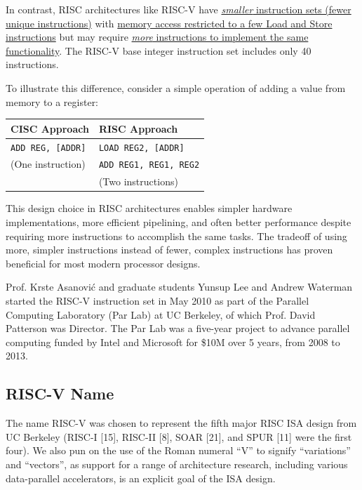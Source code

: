 \documentclass[12pt, a4paper]{article}
\begin{document}
In contrast, RISC architectures like RISC-V have \ul{\textit{smaller} instruction sets (fewer unique instructions)} with \ul{memory access restricted to a few Load and Store instructions} but may require \ul{\textit{more} instructions to implement the same functionality}. The RISC-V base integer instruction set includes only 40 instructions.

\vspace{1em}
To illustrate this difference, consider a simple operation of adding a value from memory to a register:

\begin{center}
\begin{tabular}{|l|l|}
\hline
\textbf{CISC Approach} & \textbf{RISC Approach} \\
\hline
\texttt{ADD REG, [ADDR]} & \texttt{LOAD REG2, [ADDR]} \\
(One instruction) & \texttt{ADD REG1, REG1, REG2} \\
 & (Two instructions) \\
\hline
\end{tabular}
\end{center}

\vspace{1em}
This design choice in RISC architectures enables simpler hardware implementations, more efficient pipelining, and often better performance despite requiring more instructions to accomplish the same tasks. The tradeoff of using more, simpler instructions instead of fewer, complex instructions has proven beneficial for most modern processor designs.

Prof. Krste Asanović and graduate students Yunsup Lee and Andrew Waterman started the RISC-V instruction set in May 2010 as part of the Parallel Computing Laboratory (Par Lab) at UC Berkeley, of which Prof. David Patterson was Director. The Par Lab was a five-year project to advance parallel computing funded by Intel and Microsoft for \$10M over 5 years, from 2008 to 2013.

\subsection{RISC-V Name}
The name RISC-V was chosen to represent the fifth major RISC ISA design from UC Berkeley (RISC-I [15], RISC-II [8], SOAR [21], and SPUR [11] were the first four). We also pun on the use of the Roman numeral “V” to signify “variations” and “vectors”, as support for a range of architecture research, including various data-parallel accelerators, is an explicit goal of the ISA design.
\end{document}
